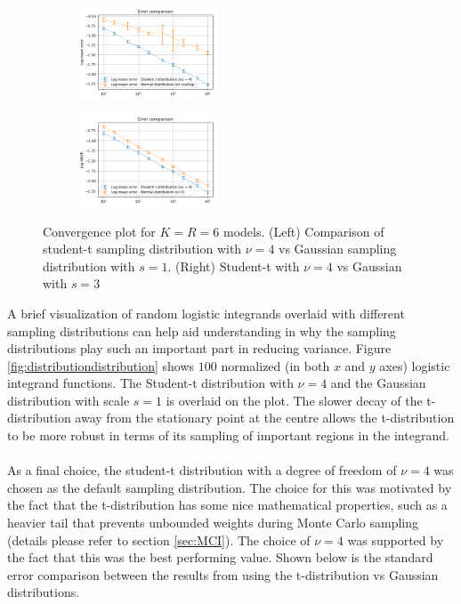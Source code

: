 \begin{figure}[!htb]
\begin{center}
\begin{subfigure}
    \centering
    \includegraphics[width=0.45\textwidth]{Chap6_EvaluationAndAnalysis/distribution_variation/Convergence_KR6_tdist_vs_gaussian_s100.png}
\end{subfigure}
\begin{subfigure}
    \centering
    \includegraphics[width=0.45\textwidth]{Chap6_EvaluationAndAnalysis/distribution_variation/Convergence_KR6_tdist_vs_gaussian_s300.png}
\end{subfigure}
\caption{Convergence plot for \(K=R=6\) models. (Left) Comparison of student-t sampling distribution with \(\nu=4\) vs Gaussian sampling distribution with \(s=1\). (Right) Student-t with \(\nu=4\) vs Gaussian with \(s=3\)}
\label{fig:ConvergencePlotTvsGauss}
\end{center}
\end{figure}

A brief visualization of random logistic integrands overlaid with different sampling distributions can help aid understanding in why the sampling distributions play such an important part in reducing variance. Figure \ref{fig:distributiondistribution} shows \(100\) normalized (in both \(x\) and \(y\) axes) logistic integrand functions. The Student-t distribution with \(\nu=4\) and the Gaussian distribution with scale \(s=1\) is overlaid on the plot. The slower decay of the t-distribution away from the stationary point at the centre allows the t-distribution to be more robust in terms of its sampling of important regions in the integrand.
\\\\
As a final choice, the student-t distribution with a degree of freedom of \(\nu=4\) was chosen as the default sampling distribution. The choice for this was motivated by the fact that the t-distribution has some nice mathematical properties, such as a heavier tail that prevents unbounded weights during Monte Carlo sampling (details please refer to section \ref{sec:MCI}). The choice of \(\nu=4\) was supported by the fact that this was the best performing value. Shown below is the standard error comparison between the results from using the t-distribution vs Gaussian distributions.

